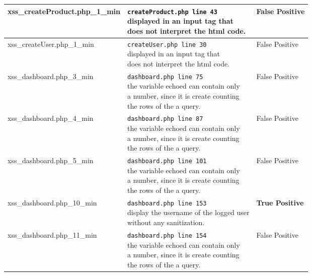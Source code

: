 \documentclass[11pt]{article}
\begin{document}
\begin{longtable}[H]{| p{} | p{} | p{} |}
	 	\hline
	  	xss\_createProduct.php\_1\_min 	
	  	& \makecell{ \texttt{createProduct.php line 43} \\
				 displayed in an input tag that  \\
				 does not interpret the html code.}
	 	& False Positive \\

	 	\hline
	  	xss\_createUser.php\_1\_min 	
	  	& \makecell{ \texttt{createUser.php line 30} \\
				 displayed in an input tag that  \\
				 does not interpret the html code.}
	 	& False Positive \\


	 	\hline
	  	xss\_dashboard.php\_3\_min 	
	  	& \makecell{ \texttt{dashboard.php line 75} \\
				 the variable echoed can contain only \\
				 a number, since it is create counting \\
				 the rows of the a query.}  
	 	& False Positive \\

	 	\hline
	  	xss\_dashboard.php\_4\_min 	
	  	& \makecell{ \texttt{dashboard.php line 87} \\
				 the variable echoed can contain only \\
				 a number, since it is create counting \\
				 the rows of the a query.}    
	 	& False Positive \\

	 	\hline
	  	xss\_dashboard.php\_5\_min 	
	  	& \makecell{ \texttt{dashboard.php line 101} \\
				 the variable echoed can contain only \\
				 a number, since it is create counting \\
				 the rows of the a query.}    
	 	& False Positive \\

	 	\hline
	  	xss\_dashboard.php\_10\_min 	
	  	& \makecell{ \texttt{dashboard.php line 153} \\
				 display the username of the logged user\\ 
				 without any sanitization.}  
	 	& \textbf{True Positive} \\

	 	\hline
	  	xss\_dashboard.php\_11\_min 	
	  	& \makecell{ \texttt{dashboard.php line 154} \\
				 the variable echoed can contain only \\
				 a number, since it is create counting \\
				 the rows of the a query.}    
	 	& False Positive \\


\end{longtable}
\end{document}
